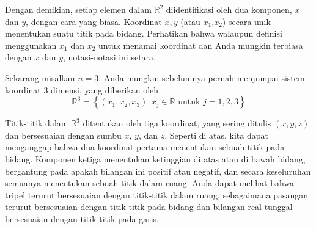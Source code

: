 \begin{center}
\par{}\label{fig:RnVectorsRn-tikz01}%

\end{center}

Dengan demikian, setiap elemen dalam $\mathbb{R}^2$ diidentifikasi oleh dua
komponen, $x$ dan $y$, dengan cara yang biasa. Koordinat $x, y$ (atau $x_1$,$x_2$) secara unik menentukan suatu titik pada bidang. Perhatikan bahwa walaupun definisi menggunakan $x_1$ dan $x_2$ untuk menamai koordinat dan Anda mungkin terbiasa dengan $x$ dan $y$, notasi-notasi ini setara.

Sekarang misalkan $n=3$. Anda mungkin sebelumnya pernah menjumpai sistem koordinat
$3$ dimensi, yang diberikan oleh
\begin{equation*}
\mathbb{R}^{3}=
\left\{ \left( x_{1}, x_{2}, x_{3}\right)
:x_{j}\in \mathbb{R}\text{ untuk }j=1,2,3 \right\}
\end{equation*}

Titik-titik dalam $\mathbb{R}^3$ ditentukan oleh tiga
koordinat, yang sering ditulis $\left(x,y,z\right)$ dan bersesuaian dengan sumbu $x$, $y$,
dan $z$. Seperti di atas, kita dapat menganggap bahwa dua koordinat pertama
menentukan sebuah titik pada bidang. Komponen ketiga menentukan
ketinggian di atas atau di bawah bidang, bergantung pada apakah bilangan ini
positif atau negatif, dan secara keseluruhan semuanya menentukan sebuah titik dalam
ruang. Anda dapat melihat bahwa tripel terurut bersesuaian dengan titik-titik dalam ruang, sebagaimana
pasangan terurut bersesuaian dengan titik-titik pada bidang dan bilangan real tunggal
bersesuaian dengan titik-titik pada garis.

